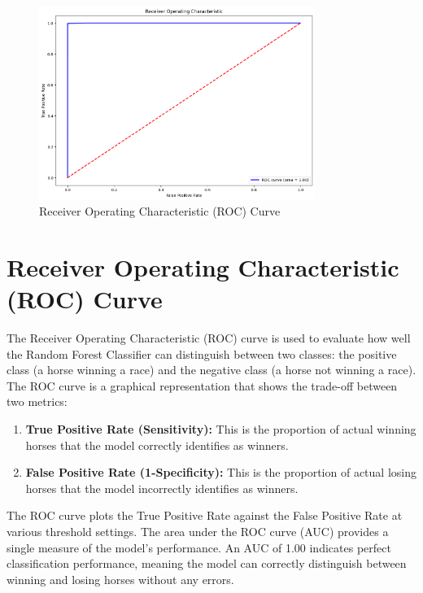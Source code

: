 \documentclass{article}
\begin{document}
\begin{figure}[H]
    \centering
    \includegraphics[width=0.8\textwidth]{images/roc_curve.png} %
    \caption{Receiver Operating Characteristic (ROC) Curve}
    \label{fig:roc_curve}
\end{figure}

\section*{Receiver Operating Characteristic (ROC) Curve}

The Receiver Operating Characteristic (ROC) curve is used to evaluate how well the Random Forest Classifier can distinguish between two classes: the positive class (a horse winning a race) and the negative class (a horse not winning a race). The ROC curve is a graphical representation that shows the trade-off between two metrics:

\begin{enumerate}
    \item \textbf{True Positive Rate (Sensitivity):} This is the proportion of actual winning horses that the model correctly identifies as winners.
    \item \textbf{False Positive Rate (1-Specificity):} This is the proportion of actual losing horses that the model incorrectly identifies as winners.
\end{enumerate}

The ROC curve plots the True Positive Rate against the False Positive Rate at various threshold settings. The area under the ROC curve (AUC) provides a single measure of the model's performance. An AUC of 1.00 indicates perfect classification performance, meaning the model can correctly distinguish between winning and losing horses without any errors.
\end{document}
